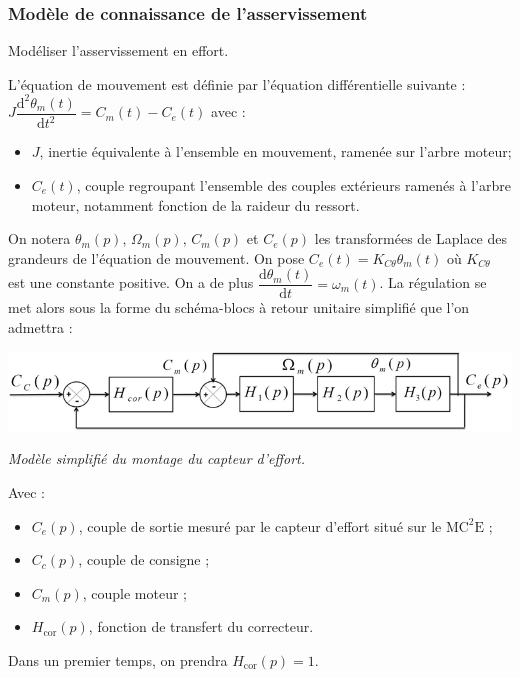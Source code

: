 \documentclass[10pt,fleqn]{article} %
\begin{document}
\subsubsection*{Modèle de connaissance de l'asservissement}

\begin{obj}
Modéliser l’asservissement en effort.
\end{obj}

L’équation de mouvement est définie par l’équation différentielle suivante : 
$J\dfrac{\text{d}^2\theta_m(t)}{\text{d}t^2}=C_m(t)-C_e(t)$  avec :
\begin{itemize}
\item $J$, inertie équivalente à l’ensemble en mouvement, ramenée sur l’arbre moteur;
\item $C_e(t)$, couple regroupant l’ensemble des couples extérieurs ramenés à l’arbre moteur, notamment fonction de la raideur du ressort.
\end{itemize}


On notera $\theta_m(p)$, $\Omega_m(p)$, $C_m(p)$ et $C_e(p)$ les transformées de Laplace des grandeurs de l’équation de mouvement.
On pose $C_e(t)=K_{C\theta}\theta_m(t)$ où  $K_{C\theta}$ est une constante positive. On a de plus $\dfrac{\text{d}\theta_m(t)}{\text{d}t}=\omega_m(t)$. La régulation se met alors sous la forme du schéma-blocs à retour unitaire simplifié que l’on
admettra :

\begin{center}
\includegraphics[width=.8\linewidth]{images/fig_06}

\textit{Modèle simplifié du montage du capteur d’effort.}
\end{center}

Avec :
\begin{itemize}
\item $C_e(p)$, couple de sortie mesuré par le capteur d’effort situé sur le $\text{MC}^2\text{E}$ ;
\item $C_c(p)$, couple de consigne ;
\item $C_m(p)$, couple moteur ;
\item $H_{\text{cor}}(p)$, fonction de transfert du correcteur.
\end{itemize}
Dans un premier temps, on prendra $H_{\text{cor}}(p)=1$.
\end{document}

